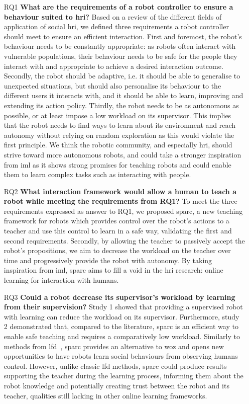 \begin{itemize}
	\item [RQ1] \textbf{What are the requirements of a robot controller to ensure a behaviour suited to \gls{hri}?} 
	Based on a review of the different fields of application of social \gls{hri}, we defined three requirements a robot controller should meet to ensure an efficient interaction. First and foremost, the robot's behaviour needs to be constantly appropriate: as robots often interact with vulnerable populations, their behaviour needs to be safe for the people they interact with and appropriate to achieve a desired interaction outcome. Secondly, the robot should be adaptive, i.e. it should be able to generalise to unexpected situations, but should also personalise its behaviour to the different users it interacts with, and it should be able to learn, improving and extending its action policy. Thirdly, the robot needs to be as autonomous as possible, or at least impose a low workload on its supervisor. This implies that the robot needs to find ways to learn about its environment and reach autonomy without relying on random exploration as this would violate the first principle. We think the robotic community, and especially \gls{hri}, should strive toward more autonomous robots, and could take a stronger inspiration from \gls{iml} as it shows strong promises for teaching robots and could enable them to learn complex tasks such as interacting with people.
	
	\item [RQ2] \textbf{What interaction framework would allow a human to teach a robot while meeting the requirements from RQ1?}
	To meet the three requirements expressed as answer to RQ1, we proposed \gls{sparc}, a new teaching framework for robots which provides control over the robot's actions to a teacher and use this control to learn in a safe way, validating the first and second requirements. Secondly, by allowing the teacher to passively accept the robot's propositions, we aim to decrease the workload on the teacher over time and progressively provide the robot with autonomy. By taking inspiration from \gls{iml}, \gls{sparc} aims to fill a void in the \gls{hri} research: online learning for interaction with humans.
	
	\item [RQ3] \textbf{Could a robot decrease its supervisor's workload by learning from their supervision?}
	Study 1 showed that providing a supervised robot with learning can reduce the workload on its supervisor. Furthermore, study 2 demonstrated that, compared to the literature, \gls{sparc} is an efficient way to enable safe teaching and requires a comparatively low workload. Similarly to methods from \gls{lfd}~\citep{liu2014train,sequeira2016discovering}, \gls{sparc} provides an alternative to \gls{woz} and opens new opportunities to have robots learn social behaviours from observing humans control. However, unlike classic \gls{lfd} methods, \gls{sparc} could produce results supporting the teacher during the learning process, informing them about the robot knowledge and potentially creating trust between the robot and its teacher, qualities still lacking in other online learning frameworks.
	

\end{itemize}
